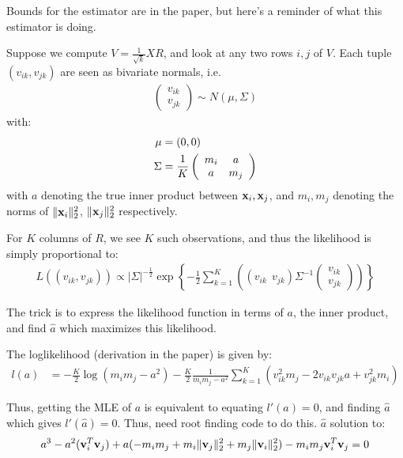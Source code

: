 \documentclass[a4paper,12pt]{article}
\numberwithin{equation}{section}
\begin{document}
 

Bounds for the estimator are in the paper, but here's a reminder of what this estimator is doing.

Suppose we compute $V = \frac{1}{\sqrt{k}}XR$, and look at any two rows $i,j$ of $V$. Each tuple $(v_{ik}, v_{jk})$ are seen as bivariate normals, i.e.
\begin{align*}
\left(\begin{array}{c}
v_{ik} \\
v_{jk}
\end{array}\right) \sim N\left( {\mu}, \Sigma  \right)
\end{align*}
with:
\begin{align*}
\mu & = (0,0) \\
\Sigma & = \frac{1}{K} \left(\begin{array}{c c}
m_i & a \\
a & m_j
\end{array}\right)
\end{align*}
with $a$ denoting the true inner product between ${\bf x}_i, {\bf x}_j$, and $m_i, m_j$ denoting the norms of $\|{\bf x}_i\|_2^2$, $\|{\bf x}_j\|_2^2$ respectively.

For $K$ columns of $R$, we see $K$ such observations, and thus the likelihood is simply proportional to:
\begin{align*}
L( (v_{ik}, v_{jk})) \propto | \Sigma |^{-\frac{1}{2}} \exp\left\{ -\frac{1}{2} \sum_{k=1}^K \left( (v_{ik} ~~ v_{jk}) \Sigma^{-1} \left(\begin{array}{c}
v_{ik} \\
v_{jk}
\end{array}\right)   \right) \right\}
\end{align*}

The trick is to express the likelihood function in terms of $a$, the inner product, and find $\hat{a}$ which maximizes this likelihood.

The loglikelihood (derivation in the paper) is given by:
\begin{align*}
l(a) & = -\frac{K}{2} \log(m_im_j - a^2) - \frac{K}{2} \frac{1}{m_im_j - a^2} \sum_{k=1}^K(v_{ik}^2m_j - 2v_{ik}v_{jk}a + v_{jk}^2m_i)
\end{align*}

Thus, getting the MLE of $a$ is equivalent to equating $l'(a) = 0$, and finding $\hat{a}$ which gives $l'(\hat{a}) = 0$. Thus, need root finding code to do this. $\hat{a}$ solution to:
\begin{align*}
a^3 - a^2({\bf v}_i^T{\bf v}_j) + a(-m_im_j + m_i\|{\bf v}_j\|_2^2 + m_j \|{\bf v}_i\|_2^2) - m_im_j {\bf v}_i^T{\bf v}_j = 0
\end{align*}
\end{document}
